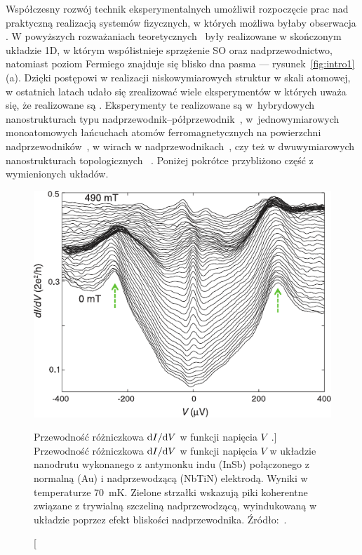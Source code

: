 Współczesny rozwój technik eksperymentalnych umożliwił rozpoczęcie prac nad praktyczną realizacją systemów fizycznych, w których możliwa byłaby obserwacja \MZM.
W powyższych rozważaniach teoretycznych \MZM\ były realizowane w skończonym układzie 1D, w którym współistnieje sprzężenie \acrshort{SO} oraz nadprzewodnictwo, natomiast poziom Fermiego znajduje się blisko dna pasma --- rysunek~\ref{fig:intro1}(a).
Dzięki postępowi w realizacji niskowymiarowych struktur w skali atomowej, w ostatnich latach udało się zrealizować wiele eksperymentów w których uważa się, że realizowane są \MZM.
Eksperymenty te realizowane są w~hybrydowych nanostrukturach typu nadprzewodnik--półprzewodnik~\cite{deng.yu.2012,mourik.zuo.2012,das.ronen.2012,finck.vanharlingen.2013,nichele.drachmann.2017,gul.zhang.2018,deng.vaitiekenas.2016,gazibegovic.car.2017,deng.vaitiekenas.2018,zhang.liu.2018,wang.kong.2018},
w~jednowymiarowych monoatomowych łańcuchach atomów ferromagnetycznych na powierzchni nadprzewodników~\cite{nadj-perge.drozdov.2014,pawlak.kisiel.2016,feldman.randeria.2016,ruby.heinrich.2017,jeon.xie.2017,kim.palaciomorales.2018},
w wirach w nadprzewodnikach~\cite{sun.jia.2017,machida.sun.2019,jiang.dai.2019,chiu.machida.2019},
czy też w dwuwymiarowych nanostrukturach topologicznych ~\cite{menard.guissart.2017,palaciomorales.mascot.2018}.
Poniżej pokrótce przybliżono część z wymienionych układów.


\begin{figure}
    \centering
    \includegraphics{04-Includes/Figures/Observe/observe1.pdf}
    \caption
    [Przewodność różniczkowa $\text dI/\text dV$  w funkcji napięcia $V$~\cite{mourik.zuo.2012}.]
{
    Przewodność różniczkowa $\text dI/\text dV$  w funkcji napięcia $V$ w układzie nanodrutu wykonanego z antymonku indu (InSb) połączonego z normalną (Au) i nadprzewodzącą (NbTiN) elektrodą. Wyniki w temperaturze $70$~mK. Zielone strzałki wskazują piki koherentne związane z trywialną szczeliną nadprzewodzącą, wyindukowaną w układzie poprzez efekt bliskości nadprzewodnika.
    Źródło:~\cite{mourik.zuo.2012}.
}
    \label{fig:observe1}
\end{figure}


